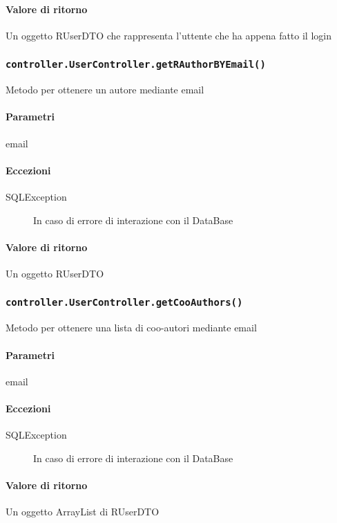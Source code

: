 \paragraph{Valore di ritorno}
Un oggetto RUserDTO che rappresenta l'uttente che ha appena fatto il login


\subsubsection{\texttt{controller.UserController.getRAuthorBYEmail()}}
Metodo per ottenere un autore mediante email
\paragraph{Parametri}
\begin{description}
\item email
\end{description}
\paragraph{Eccezioni}
\begin{description}
\item[SQLException] In caso di errore di interazione con il DataBase
\end{description}
\paragraph{Valore di ritorno}
Un oggetto RUserDTO

\subsubsection{\texttt{controller.UserController.getCooAuthors()}}
Metodo per ottenere una lista di coo-autori mediante email
\paragraph{Parametri}
\begin{description}
\item email
\end{description}
\paragraph{Eccezioni}
\begin{description}
\item[SQLException] In caso di errore di interazione con il DataBase
\end{description}
\paragraph{Valore di ritorno}
Un oggetto ArrayList di RUserDTO


